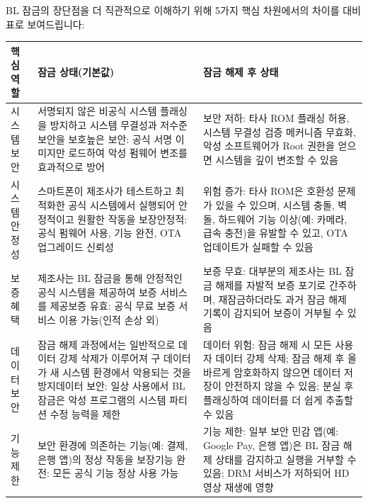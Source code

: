 
BL 잠금의 장단점을 더 직관적으로 이해하기 위해 5가지 핵심 차원에서의 차이를 대비 표로 보여드립니다:

\begin{center}
\begin{tabularx}{\linewidth}{|X|X|X|}
\hline
\textbf{핵심 역할} & \textbf{잠금 상태(기본값)} & \textbf{잠금 해제 후 상태} \tabularnewline
\hline
시스템보안 & 서명되지 않은 비공식 시스템 플래싱을 방지하고 시스템 무결성과 저수준 보안을 보호\newline 높은 보안: 공식 서명 이미지만 로드하여 악성 펌웨어 변조를 효과적으로 방어 & 보안 저하: 타사 ROM 플래싱 허용, 시스템 무결성 검증 메커니즘 무효화, 악성 소프트웨어가 Root 권한을 얻으면 시스템을 깊이 변조할 수 있음 \tabularnewline
시스템 안정성 & 스마트폰이 제조사가 테스트하고 최적화한 공식 시스템에서 실행되어 안정적이고 원활한 작동을 보장\newline 안정적: 공식 펌웨어 사용, 기능 완전, OTA 업그레이드 신뢰성 & 위험 증가: 타사 ROM은 호환성 문제가 있을 수 있으며, 시스템 충돌, 벽돌, 하드웨어 기능 이상(예: 카메라, 급속 충전)을 유발할 수 있고, OTA 업데이트가 실패할 수 있음 \tabularnewline
보증 혜택 & 제조사는 BL 잠금을 통해 안정적인 공식 시스템을 제공하여 보증 서비스를 제공\newline 보증 유효: 공식 무료 보증 서비스 이용 가능(인적 손상 외) & 보증 무효: 대부분의 제조사는 BL 잠금 해제를 자발적 보증 포기로 간주하며, 재잠금하더라도 과거 잠금 해제 기록이 감지되어 보증이 거부될 수 있음 \tabularnewline
데이터보안 & 잠금 해제 과정에서는 일반적으로 데이터 강제 삭제가 이루어져 구 데이터가 새 시스템 환경에서 악용되는 것을 방지\newline 데이터 보안: 일상 사용에서 BL 잠금은 악성 프로그램의 시스템 파티션 수정 능력을 제한 & 데이터 위험: 잠금 해제 시 모든 사용자 데이터 강제 삭제; 잠금 해제 후 올바르게 암호화하지 않으면 데이터 저장이 안전하지 않을 수 있음; 분실 후 플래싱하여 데이터를 더 쉽게 추출할 수 있음 \tabularnewline
기능 제한 & 보안 환경에 의존하는 기능(예: 결제, 은행 앱)의 정상 작동을 보장\newline 기능 완전: 모든 공식 기능 정상 사용 가능 & 기능 제한: 일부 보안 민감 앱(예: Google Pay, 은행 앱)은 BL 잠금 해제 상태를 감지하고 실행을 거부할 수 있음; DRM 서비스가 저하되어 HD 영상 재생에 영향 \tabularnewline
\hline
\end{tabularx}
\end{center}


